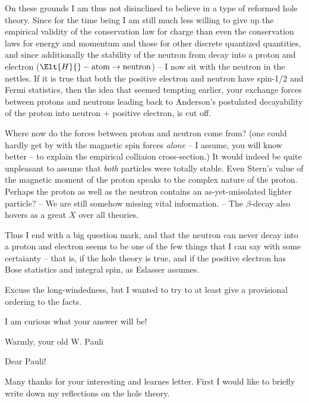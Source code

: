 \documentclass{article}
\begin{document}
On these grounds I am thus not disinclined to believe in a type of reformed hole theory. Since for the time being I am still much less willing to give up the empirical validity of the conservation law for charge than even the conservation laws for energy and momentum and those for other discrete quantized quantities, and since additionally the stability of the neutron from decay into a proton and electron  ($\Elt{H}{}-\text{atom} \to \text{neutron}$) -- I now sit with the neutron in the nettles. If it is true that both the positive electron and neutron have spin-1/2 and Fermi statistics, then the idea that seemed tempting earlier, your exchange forces between protons and neutrons leading back to Anderson's postulated decayability of the proton into neutron + positive electron, is cut off.

Where now do the forces between proton and neutron come from? (one could hardly get by with the magnetic spin forces \textit{alone} -- I assume, you will know better -- to explain the empirical colliaion cross-section.) It would indeed be quite unpleasant to assume that \textit{both} particles were totally stable. Even Stern's value of the magnetic moment of the proton speaks to the complex nature of the proton. Perhaps the proton as well as the neutron contains an as-yet-unisolated lighter particle? -- We are still somehow missing vital information. -- The $\beta$-decay also hovers as a great $X$ over all theories.

Thus I end with a big question mark, and that the neutron can never decay into a proton and electron seems to be one of the few things that I can say with some certaianty -- that is, if the hole theory is true, and if the positive electron has Bose statistics and integral spin, as Eslasser assumes.

Excuse the long-windedness, but I wanted to try to at least give a provisional ordering to the facts.

I am curious what your answer will be!

Warmly, your old W. Pauli

\date{July 17, 1933}

Dear Pauli!

Many thanks for your interesting and learnes letter. First I would like to briefly write down my reflections on the hole theory.
\end{document}
